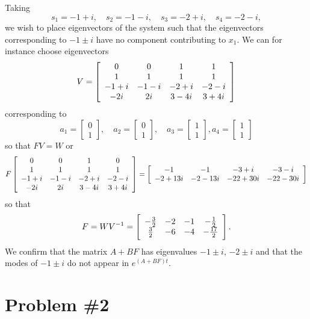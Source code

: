 \documentclass{article}
\begin{document}
Taking
$$
s_1 = -1 + i, \quad
s_2 = -1 - i, \quad
s_3 = -2 + i, \quad
s_4 = -2 - i,
$$
we wish to place eigenvectors of the system such that the
eigenvectors corresponding to $-1 \pm i$ have no component
contributing to $x_1$. We can for instance choose eigenvectors
$$
V =
\left[\begin{array}{c c c c}
     0 &    0 &    1 &     1 \\
     1 &    1 &    1 &     1 \\
  -1+i & -1-i & -2+i &  -2-i \\
   -2i &   2i & 3-4i &  3+4i
\end{array}\right]
$$
corresponding to
$$
a_1 =
\left[\begin{array}{c}
  0 \\ 1
\end{array}\right], \quad
a_2 =
\left[\begin{array}{c}
  0 \\ 1
\end{array}\right], \quad
a_3 =
\left[\begin{array}{c}
  1 \\ 1
\end{array}\right],
a_4 =
\left[\begin{array}{c}
  1 \\ 1
\end{array}\right]
$$
so that $FV = W$
or
$$
F
\left[\begin{array}{c c c c}
     0 &    0 &     1 &    0 \\
     1 &    1 &     1 &    1 \\
  -1+i & -1-i &  -2+i & -2-i \\
   -2i &   2i &  3-4i & 3+4i
\end{array}\right]
=
\left[\begin{array}{c c c c}
        -1 &       -1 &   -3 + i &    -3 - i \\
  -2 + 13i & -2 - 13i & -22 +30i & -22 - 30i
\end{array}\right]
$$
so that
$$
F = WV^{-1} =
\left[\begin{array}{c c c c}
  -\frac{3}{2} & -2 & -1 & -\frac{1}{2} \\
   \frac{3}{2} & -6 & -4 & -\frac{17}{2}
\end{array}\right].
$$
We confirm that the matrix $A + BF$ has eigenvalues
$-1 \pm i$, $-2 \pm i$ and that the modes of $-1 \pm i$ do not appear
in $e^{(A + BF)t}$.

\section*{Problem \#2}
\end{document}

